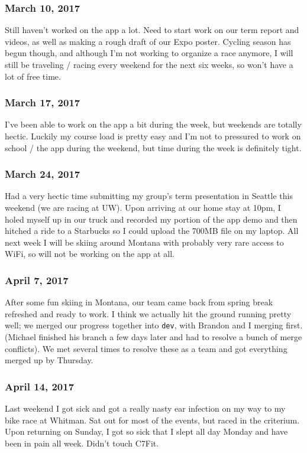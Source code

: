 \subsubsection{March 10, 2017}\label{section}
Still haven't worked on the app a lot. Need to start work on our term 
report and videos, as well as making a rough draft of our Expo poster.
Cycling season has begun though, and although I'm not working to organize
a race anymore, I will still be traveling / racing every weekend for the
next six weeks, so won't have a lot of free time.

\subsubsection{March 17, 2017}\label{section}
I've been able to work on the app a bit during the week, but weekends are 
totally hectic. Luckily my course load is pretty easy and I'm not to 
pressured to work on school / the app during the weekend, but time during 
the week is definitely tight.

\subsubsection{March 24, 2017}\label{section}
Had a very hectic time submitting my group's term presentation in Seattle
this weekend (we are racing at UW). Upon arriving at our home stay at 10pm,
I holed myself up in our truck and recorded my portion of the app demo and 
then hitched a ride to a Starbucks so I could upload the 700MB file on 
my laptop. All next week I will be skiing around Montana with probably very
rare access to WiFi, so will not be working on the app at all.

\subsubsection{April 7, 2017}\label{section}
After some fun skiing in Montana, our team came back from spring break
refreshed and ready to work. I think we actually hit the ground
running pretty well; we merged our progress together into \texttt{dev},
with Brandon and I merging first. (Michael finished his branch a few
days later and had to resolve a bunch of merge conflicts). We met
several times to resolve these as a team and got everything merged up by
Thursday.

\subsubsection{April 14, 2017}\label{section}
Last weekend I got sick and got a really nasty ear infection on my way
to my bike race at Whitman. Sat out for most of the events, but raced
in the criterium. Upon returning on Sunday, I got so sick that I slept
all day Monday and have been in pain all week. Didn't touch C7Fit.

